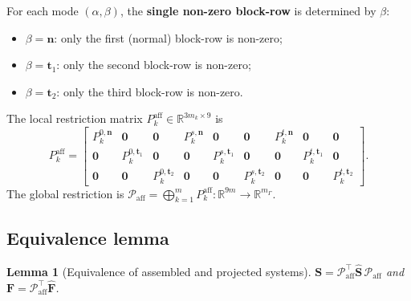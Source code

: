 \documentclass[11pt,a4paper]{article}
\newtheorem{lemma}{Lemma}[section]
\newcommand{\R}{\mathbb{R}}
\newcommand{\normal}{\bm{n}}
\newcommand{\Schur}{\mathbf{S}}
\begin{document}
For each mode $(\alpha,\beta)$, the \textbf{single non-zero block-row}
is determined by $\beta$:
\begin{itemize}[nosep,leftmargin=*]
  \item $\beta = \normal$: only the first (normal) block-row is non-zero;
  \item $\beta = \bm{t}_1$: only the second block-row is non-zero;
  \item $\beta = \bm{t}_2$: only the third block-row is non-zero.
\end{itemize}
The local restriction matrix $P_k^{\text{aff}} \in \R^{3m_k \times 9}$ is
\begin{equation}\label{eq:restriction}
  P_k^{\text{aff}} =
  \begin{bmatrix}
    P_k^{0,\normal} & \bm{0} & \bm{0} &
    P_k^{s,\normal} & \bm{0} & \bm{0} &
    P_k^{t,\normal} & \bm{0} & \bm{0} \\[2pt]
    \bm{0} & P_k^{0,\bm{t}_1} & \bm{0} &
    \bm{0} & P_k^{s,\bm{t}_1} & \bm{0} &
    \bm{0} & P_k^{t,\bm{t}_1} & \bm{0} \\[2pt]
    \bm{0} & \bm{0} & P_k^{0,\bm{t}_2} &
    \bm{0} & \bm{0} & P_k^{s,\bm{t}_2} &
    \bm{0} & \bm{0} & P_k^{t,\bm{t}_2}
  \end{bmatrix}.
\end{equation}
The global restriction is
$\mathcal{P}_{\text{aff}} = \bigoplus_{k=1}^m P_k^{\text{aff}}
 : \R^{9m} \to \R^{m_\Gamma}$.

\subsection{Equivalence lemma}

\begin{lemma}[Equivalence of assembled and projected systems]\label{lem:equivalence}
  $\Schur = \mathcal{P}_{\text{aff}}^\top \widehat{\Schur}\,
           \mathcal{P}_{\text{aff}}$ and
  $\bm{F} = \mathcal{P}_{\text{aff}}^\top \widehat{\bm{F}}$.
\end{lemma}
\end{document}
